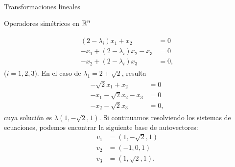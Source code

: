 \begin{chapter}{Transformaciones lineales}
\begin{section}{Operadores simétricos en $\mathbb R^n$}
\begin{ejemplo*}
        \begin{align*}
        \begin{split}
        (2 -\lambda_i)x_1+ x_2  &= 0 \\
        -x_1 +(2-\lambda_i)x_2  -x_3 &=0 \\
        -x_2 + (2-\lambda_i)x_3 &= 0,  
        \end{split}
        \end{align*}
        ($i=1,2,3$).
        En el caso de $\lambda_1= 2 + \sqrt 2$,  resulta
        \begin{align*}
        \begin{split}
        -\sqrt 2x_1+ x_2  &= 0 \\
        -x_1 -\sqrt 2x_2  -x_3 &=0 \\
        -x_2 -\sqrt 2x_3 &= 0,  
        \end{split}
        \end{align*}
        cuya solución es $\lambda(1, -\sqrt2, 1)$. Si continuamos resolviendo los sistemas de ecuaciones, podemos encontrar la siguiente base de autovectores:
        \begin{align*}
        v_1 &= (1, -\sqrt2, 1) \\		
        v_2 &= (-1, 0, 1) \\		
        v_3 &= (1, \sqrt2, 1).
        \end{align*}
        
    \end{ejemplo*}
    
    \end{section}

        
    \end{chapter}